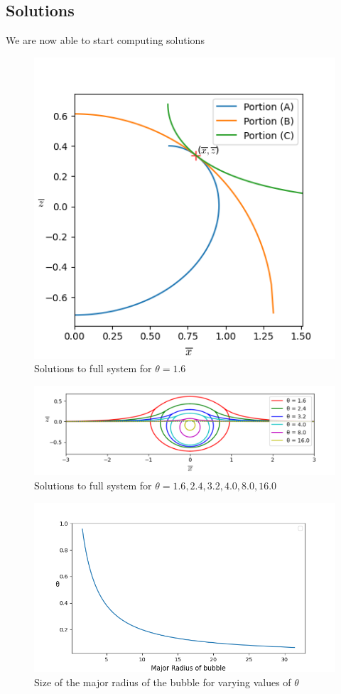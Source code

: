 \subsection{Solutions}
We are now able to start computing solutions
\begin{figure}[hb]
    \centering
    \includegraphics[width=0.85\linewidth]{WriteUp/images/combined theta=1.6.png}
    \caption{Solutions to full system for $\theta=1.6$}
    \label{fig:8}
\end{figure}
\begin{figure}[hb]
    \centering
    \includegraphics[width=0.85\linewidth]{WriteUp/images/many bubbles ontop one another.png}
    \caption{Solutions to full system for $\theta=1.6,2.4,3.2,4.0,8.0,16.0$}
    \label{fig:9}
\end{figure}
\begin{figure}[hb]
    \centering
    \includegraphics[width=0.85\linewidth]{WriteUp/images/radius over theta.png}
    \caption{Size of the major radius of the bubble for varying values of $\theta$}
    \label{fig:10}
\end{figure}
